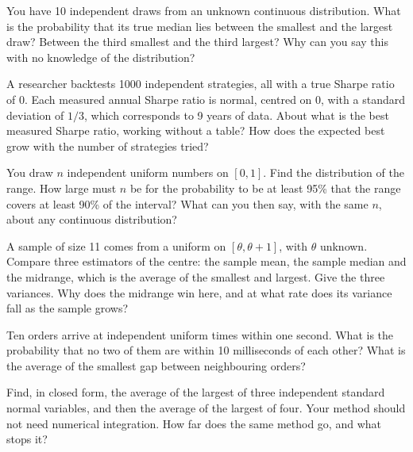\begin{question}\label{iq:iv1:order-statistics:10}
You have 10 independent draws from an unknown continuous distribution. What is the probability that its true median lies between the smallest and the largest draw? Between the third smallest and the third largest? Why can you say this with no knowledge of the distribution?
\end{question}

\begin{question}\label{iq:iv1:order-statistics:11}
A researcher backtests 1000 independent strategies, all with a true Sharpe ratio of 0. Each measured annual Sharpe ratio is normal, centred on 0, with a standard deviation of $1/3$, which corresponds to 9 years of data. About what is the best measured Sharpe ratio, working without a table? How does the expected best grow with the number of strategies tried?
\end{question}

\begin{question}\label{iq:iv1:order-statistics:12}
You draw $n$ independent uniform numbers on $[0, 1]$. Find the distribution of the range. How large must $n$ be for the probability to be at least 95\% that the range covers at least 90\% of the interval? What can you then say, with the same $n$, about any continuous distribution?
\end{question}

\begin{question}\label{iq:iv1:order-statistics:13}
A sample of size 11 comes from a uniform on $[\theta, \theta + 1]$, with $\theta$ unknown. Compare three estimators of the centre: the sample mean, the sample median and the midrange, which is the average of the smallest and largest. Give the three variances. Why does the midrange win here, and at what rate does its variance fall as the sample grows?
\end{question}

\begin{question}\label{iq:iv1:order-statistics:14}
Ten orders arrive at independent uniform times within one second. What is the probability that no two of them are within 10 milliseconds of each other? What is the average of the smallest gap between neighbouring orders?
\end{question}

\begin{question}\label{iq:iv1:order-statistics:15}
Find, in closed form, the average of the largest of three independent standard normal variables, and then the average of the largest of four. Your method should not need numerical integration. How far does the same method go, and what stops it?
\end{question}
